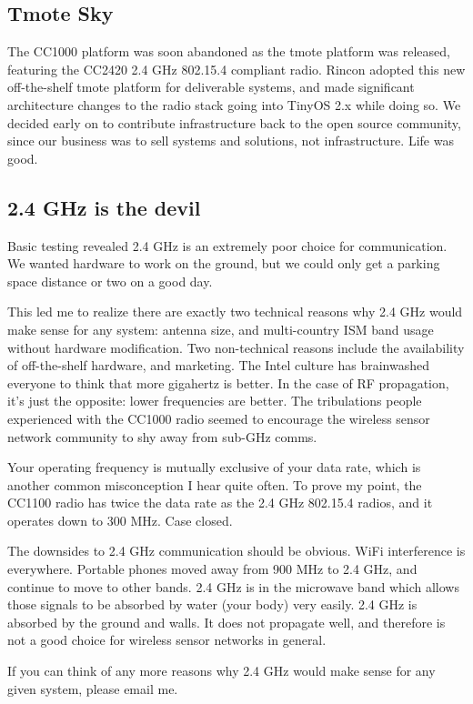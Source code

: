 \documentclass{article}
\begin{document}
\subsection{Tmote Sky}
The CC1000 platform was soon abandoned as the tmote platform was released, featuring the CC2420 
2.4 GHz 802.15.4 compliant radio. Rincon adopted this new off-the-shelf tmote platform for 
deliverable systems, and made significant architecture changes to the radio stack going into 
TinyOS 2.x while doing so. We decided early on to contribute infrastructure back to the
open source community, since our business was to sell systems and solutions, not infrastructure. Life was good.

\subsection{2.4 GHz is the devil}
Basic testing revealed 2.4 GHz is an extremely poor choice for communication. We wanted hardware
to work on the ground, but we could only get a parking space distance or two on a good day. 

This led me to realize there are exactly two technical reasons why 2.4 GHz would make sense 
for any system: antenna size, and multi-country ISM band usage without hardware modification. 
Two non-technical reasons include the availability of off-the-shelf hardware, and marketing. 
The Intel culture has brainwashed everyone to think 
that more gigahertz is better. In the case of RF propagation, it's just the opposite: lower frequencies
are better. The tribulations people experienced with the CC1000 radio seemed to encourage
the wireless sensor network community to shy away from sub-GHz comms.

Your operating frequency is mutually exclusive of your data rate, which is another 
common misconception I hear quite often. To prove my point, the CC1100 radio has twice the 
data rate as the 2.4 GHz 802.15.4 radios, and it operates down to 300 MHz. Case closed.

The downsides to 2.4 GHz communication should be obvious. WiFi interference is everywhere. Portable
phones moved away from 900 MHz to 2.4 GHz, and continue to move to other bands. 2.4 GHz is in the
microwave band which allows those signals to be absorbed by water (your body) very easily. 2.4 GHz is absorbed
by the ground and walls.  It does not propagate well, and therefore is not a good choice for 
wireless sensor networks in general.

If you can think of any more reasons why 2.4 GHz would make sense for any given system, please email me. 
\end{document}
